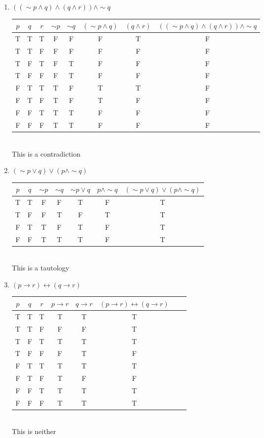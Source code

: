 \documentclass{article}
\begin{document}
\begin{enumerate}
\begin{enumerate}
	\item \( ((\sim p \land q) \land (q \land r)) \land \sim q \) \\

	\begin{tabular}{|c|c|c|c|c|c|c|c|}
		\hline
		$p$ & $q$ & $r$ & $\sim p$ & $\sim q$ & $(\sim p \land q)$ & $(q \land r)$ & $((\sim p \land q) \land (q \land r)) \land \sim q$ \\
		\hline
		T & T & T & F & F & F & T & F \\
		T & T & F & F & F & F & F & F \\
		T & F & T & F & T & F & F & F \\
		T & F & F & F & T & F & F & F \\
		F & T & T & T & F & T & T & F \\
		F & T & F & T & F & T & F & F \\
		F & F & T & T & T & F & F & F \\
		F & F & F & T & T & F & F & F \\
		\hline
	\end{tabular}
	\\
	This is a contradiction
	
	\item \( (\sim p \lor q) \lor (p \land \sim q) \) \\
	\begin{tabular}{|c|c|c|c|c|c|c|}
		\hline
		$p$ & $q$ & $\sim p$ & $\sim q$ & $\sim p \lor q$ & $p \land \sim q$ & $(\sim p \lor q) \lor (p \land \sim q)$ \\
		\hline
		T & T & F & F & T & F & T \\
		T & F & F & T & F & T & T \\
		F & T & T & F & T & F & T \\
		F & F & T & T & T & F & T \\
		\hline
	\end{tabular}
	\\
	This is a tautology 
	
	\item \( (p \rightarrow r) \leftrightarrow (q \rightarrow r) \) \\
	\begin{tabular}{|c|c|c|c|c|c|c|c|}
		\hline
		$p$ & $q$ & $r$ & $p \rightarrow r$ & $q \rightarrow r$ & $(p \rightarrow r) \leftrightarrow (q \rightarrow r)$ \\
		\hline
		T & T & T & T & T & T \\
		T & T & F & F & F & T \\
		T & F & T & T & T & T \\
		T & F & F & F & T & F \\
		F & T & T & T & T & T \\
		F & T & F & T & F & F \\
		F & F & T & T & T & T \\
		F & F & F & T & T & T \\
		\hline
	\end{tabular}
	\\
	This is neither
	

\end{enumerate}
\end{enumerate}
\end{document}
